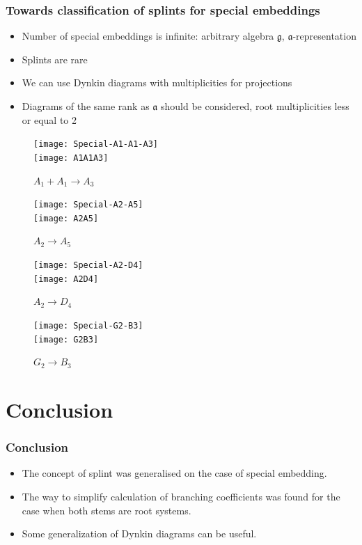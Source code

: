 \documentclass[pdftex]{beamer}
\newcommand{\gf}{\mathfrak{g}}
\newcommand{\af}{\mathfrak{a}}
\theoremstyle{definition} \newtheorem{Def}{Definition}
\begin{document}
\begin{frame}
  \frametitle{Towards classification of splints for special embeddings}
  \begin{itemize}
  \item Number of special embeddings is infinite: arbitrary algebra $\gf$, $\af$-representation
  \item Splints are rare
  \item We can use Dynkin diagrams with multiplicities for projections
  \item Diagrams of the same rank as $\af$ should be considered, root multiplicities less or equal to 2
  \end{itemize}
\vspace{-0.3cm}
  \begin{multicols}{4}
    \begin{figure}[h!tb]
      \texttt{[image: Special-A1-A1-A3]}      \\
      \texttt{[image: A1A1A3]}      
      \caption{$A_1+A_1\to A_3$}
      \label{fig:a1a1a3}
    \end{figure}
    \begin{figure}[h!tb]
      \texttt{[image: Special-A2-A5]}      \\
      \texttt{[image: A2A5]}      \vspace{-0.3cm}
      \caption{$A_2\to A_5$}
      \label{fig:a2a5}
    \end{figure}\par
    \begin{figure}[h!tb]
      \texttt{[image: Special-A2-D4]}\\
      \texttt{[image: A2D4]}      
      \caption{$A_2\to D_4$}
      \label{fig:a2d4}
    \end{figure}
    \begin{figure}[h!tb]
      \texttt{[image: Special-G2-B3]}      \\
      \texttt{[image: G2B3]}      \vspace{-0.2cm}
      \caption{$G_2\to B_3$}
      \label{fig:g2b3}
    \end{figure}
    
  \end{multicols}

\end{frame}
\section{Conclusion}


\begin{frame}
  \frametitle{Conclusion}
  \begin{itemize}
  \item The concept of splint was generalised on the case of special embedding.
  \item The way to simplify calculation of branching coefficients was found for the case when both stems are root systems.
  \item Some generalization of Dynkin diagrams can be useful. 
  \end{itemize}

\end{frame}
\end{document}
